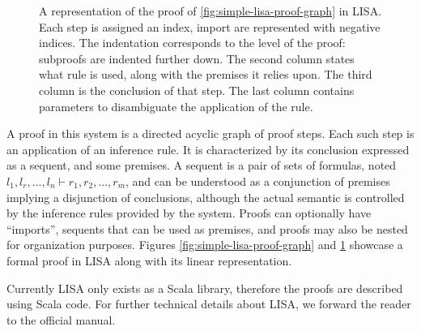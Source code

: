 \begin{figure}[H]
  \centering
  
  \caption[Proof in LISA (1)]{A representation of the proof of \autoref{fig:simple-lisa-proof-graph} in LISA. Each step is assigned an index, import are represented with negative indices. The indentation corresponds to the level of the proof: subproofs are indented further down. The second column states what rule is used, along with the premises it relies upon. The third column is the conclusion of that step. The last column contains parameters to disambiguate the application of the rule.}
  \label{fig:simple-lisa-proof}
\end{figure}

A proof in this system is a directed acyclic graph of proof steps. Each such step is an application of an inference rule. It is characterized by its conclusion expressed as a sequent, and some premises. A sequent is a pair of sets of formulas, noted $l_1, l_r, ..., l_n \vdash r_1, r_2, ..., r_m$, and can be understood as a conjunction of premises implying a disjunction of conclusions, although the actual semantic is controlled by the inference rules provided by the system. Proofs can optionally have ``imports'', sequents that can be used as premises, and proofs may also be nested for organization purposes. Figures \ref{fig:simple-lisa-proof-graph} and \ref{fig:simple-lisa-proof} showcase a formal proof in LISA along with its linear representation.

Currently LISA only exists as a Scala library, therefore the proofs are described using Scala code. For further technical details about LISA, we forward the reader to the official manual.
